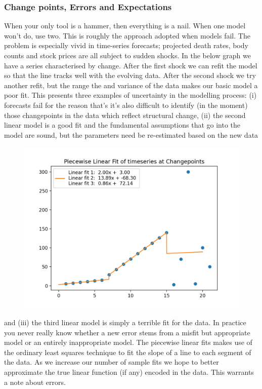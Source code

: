 \documentclass[10pt,a4paper,notitlepage, twocolumn]{article}
\begin{document}
\subsubsection*{Change points, Errors and Expectations}
When your only tool is a hammer, then everything is a nail. When one model won't do, use two. This is roughly the approach adopted when models fail. The problem is especially vivid in time-series forecasts; projected death rates, body counts and stock prices are all subject to sudden shocks. In the below graph we have a series characterised by change. After the first shock we can refit the model so that the line tracks well with the evolving data. After the second shock we try another refit, but the range the and variance of the data makes our basic model a poor fit. This presents three examples of uncertainty in the modelling process: (i) forecasts fail for the reason that's it's also difficult to identify (in the moment) those changepoints in the data which reflect structural change, (ii) the second linear model is a good fit and the fundamental assumptions that go into the model are sound, but the parameters need be re-estimated based on the new data
\begin{figure}[H]
  \includegraphics[width=\linewidth]{./Plots/piecewise_linear_fits.png}
\end{figure}
and (iii) the third linear model is simply a terrible fit for the data. In practice you never really know whether a new error stems from a misfit but appropriate model or an entirely inappropriate model. The piecewise linear fits makes use of the ordinary least squares technique to fit the slope of a line to each segment of the data. As we increase our number of sample fits we hope to better approximate the true linear function (if any) encoded in the data. This warrants a note about errors.
\end{document}
